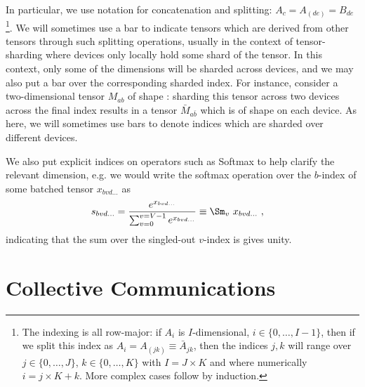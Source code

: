 In particular, we use  notation for concatenation and splitting: $ A _{ c } = A _{
    (de) }= B _{ de } $\footnote{The indexing is all row-major: if $ A _{ i } $ is $
        I$-dimensional, $ i \in \{0, \ldots, I-1\} $, then if we split this index as $ A _{ i } = A
        _{ (jk) } \equiv \bar{A} _{ jk } $, then the indices $ j, k $ will range over $ j \in \{0,
    \ldots , J\} $, $ k\in \{0, \ldots , K\} $ with $ I =J \times K $ and where numerically $ i = j
\times K + k $. More complex cases follow by induction.}. We will sometimes use a bar to indicate
tensors which  are derived from other tensors through such splitting operations, usually in the
context of tensor-sharding where devices only locally hold some shard of the tensor. In this
context, only some of the dimensions will be sharded across devices, and we may also put a bar over
the corresponding sharded index. For instance, consider a two-dimensional tensor $ M _{ ab } $ of
shape : sharding this tensor across two devices across the final index
results in a tensor $ \bar{M}_{ a \bar{b} } $ which is of shape  on
each device. As here, we will sometimes use bars to denote indices which are sharded over different
devices.

We also put explicit indices on operators such as Softmax to help clarify the relevant
dimension, e.g. we would write the softmax operation over the $ b $-index of some batched
tensor $ x _{ bvd\ldots } $ as
\begin{align}
	s _{ bvd\ldots } & = \frac{ e^{ x _{ bv d\ldots}  } }{ \sum _{ v = 0 } ^{  v= V-1 } e^{ x _{
						bvd\ldots } } } \equiv
	\Sm _{ v } \ x _{ bvd\ldots }
	\ , \label{app_eq_einstein_softmax}
\end{align}
indicating that the sum over the singled-out $ v $-index is gives unity.

\section{Collective Communications \label{app_collective_communications} }

